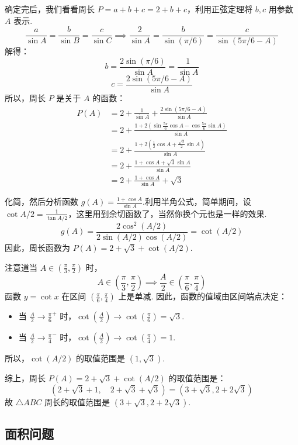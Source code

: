 \begin{solution}
	确定完后，我们看看周长 $P = a+b+c = 2+b+c$，利用正弦定理将 $b,c$ 用参数 $A$ 表示.
	\[
	\frac{a}{\sin A} = \frac{b}{\sin B} = \frac{c}{\sin C} \implies \frac{2}{\sin A} = \frac{b}{\sin(\pi/6)} = \frac{c}{\sin(5\pi/6 - A)}
	\]
	解得：
	\[
	b = \frac{2\sin(\pi/6)}{\sin A} = \frac{1}{\sin A}
	\]
	\[
	c = \frac{2\sin(5\pi/6 - A)}{\sin A}
	\]
	所以，周长 $P$ 是关于 $A$ 的函数：
	\begin{align*}
		P(A) &= 2 + \frac{1}{\sin A} + \frac{2\sin(5\pi/6 - A)}{\sin A} \\
		&= 2 + \frac{1 + 2\left(\sin\frac{5\pi}{6}\cos A - \cos\frac{5\pi}{6}\sin A\right)}{\sin A} \\
		&= 2 + \frac{1 + 2\left(\frac{1}{2}\cos A + \frac{\sqrt{3}}{2}\sin A\right)}{\sin A} \\
		&= 2 + \frac{1 + \cos A + \sqrt{3}\sin A}{\sin A} \\
		&= 2 + \frac{1+\cos A}{\sin A} + \sqrt{3}
	\end{align*}
	
	化简，然后分析函数 $g(A) = \frac{1+\cos A}{\sin A}$.利用半角公式，简单期间，设$\cot A/2 = \frac{1}{\tan A/2}$，这里用到余切函数了，当然你换个元也是一样的效果.
	\[
	g(A) = \frac{2\cos^2(A/2)}{2\sin(A/2)\cos(A/2)} = \cot(A/2)
	\]
	因此，周长函数为 $P(A) = 2 + \sqrt{3} + \cot(A/2)$.
	
	注意道当 $A \in (\frac{\pi}{3}, \frac{\pi}{2})$ 时，
	\[
	A \in \left(\frac{\pi}{3}, \frac{\pi}{2}\right) \implies \frac{A}{2} \in \left(\frac{\pi}{6}, \frac{\pi}{4}\right)
	\]
	函数 $y = \cot x$ 在区间 $(\frac{\pi}{6}, \frac{\pi}{4})$ 上是单减.
	因此，函数的值域由区间端点决定：
	\begin{itemize}
		\item 当 $\frac{A}{2} \to \frac{\pi}{6}^+$ 时，$\cot(\frac{A}{2}) \to \cot(\frac{\pi}{6}) = \sqrt{3}$.
		\item 当 $\frac{A}{2} \to \frac{\pi}{4}^-$ 时，$\cot(\frac{A}{2}) \to \cot(\frac{\pi}{4}) = 1$.
	\end{itemize}
	所以，$\cot(A/2)$ 的取值范围是 $(1, \sqrt{3})$.
	
	综上，周长 $P(A) = 2+\sqrt{3} + \cot(A/2)$ 的取值范围是：
	\[
	\left(2+\sqrt{3} + 1, \quad 2+\sqrt{3} + \sqrt{3}\right) = \left(3+\sqrt{3}, 2+2\sqrt{3}\right)
	\]
	故 $\triangle ABC$ 周长的取值范围是 $(3+\sqrt{3}, 2+2\sqrt{3})$.\hfill\qedsymbol
\end{solution}

\subsection{面积问题}
